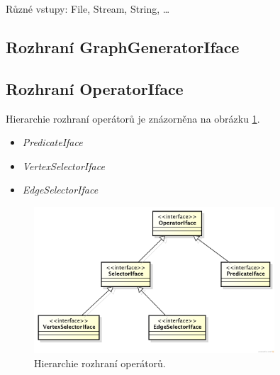 Různé vstupy: File, Stream, String, \ldots

\subsection{Rozhraní GraphGeneratorIface}

\subsection{Rozhraní OperatorIface}
Hierarchie rozhraní operátorů je znázorněna na obrázku \ref{design-operator_interfaces_hierarchy}.

\begin{itemize}
\item \emph{PredicateIface}
\item \emph{VertexSelectorIface}
\item \emph{EdgeSelectorIface}
\end{itemize}

\begin{figure}[h!]
  \centering
  \includegraphics[width=0.8\textwidth]{./uml/operator_interfaces.png}
  \caption{Hierarchie rozhraní operátorů.\label{design-operator_interfaces_hierarchy}}
\end{figure}


